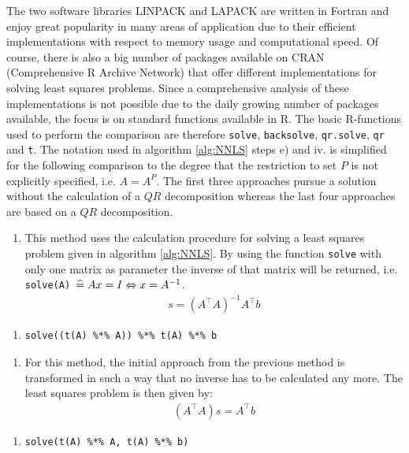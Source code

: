 The two software libraries LINPACK and LAPACK are written in Fortran and enjoy great popularity in many areas of application due to their efficient implementations with respect to memory usage and computational speed. Of course, there is also a big number of packages available on CRAN (Comprehensive R Archive Network) that offer different implementations for solving least squares problems. Since a comprehensive analysis of these implementations is not possible due to the daily growing number of packages available, the focus is on standard functions available in \textsf{R}. The basic \textsf{R}-functions used to perform the comparison are therefore \texttt{solve}, \texttt{backsolve}, \texttt{qr.solve}, \texttt{qr} and \texttt{t}. The notation used in algorithm \ref{alg:NNLS} steps e) and iv. is simplified for the following comparison to the degree that the restriction to set $P$ is not explicitly specified, i.e. $A = A^P$. The first three approaches pursue a solution without the calculation of a $QR$ decomposition whereas the last four approaches are based on a $QR$ decomposition. 


\begin{enumerate}[label={\bfseries Method \arabic*:}, leftmargin=*, labelindent=1em, series = quest]
	\item This method uses the calculation procedure for solving a least squares problem given in algorithm \ref{alg:NNLS}. By using the function \texttt{solve} with only one matrix as parameter the inverse of that matrix will be returned, i.e. \texttt{solve(A) $\mathrel{\widehat=} Ax = I \Leftrightarrow x = A^{-1}$}. 
	\begin{align*}
		s = (A^\top A)^{-1} A^\top b
	\end{align*}
\end{enumerate}

\begin{enumerate}[series = inform]
	\item[] \begin{lstlisting}[otherkeywords={\%*\%}, numbers=none]
			solve((t(A) %*% A)) %*% t(A) %*% b
			\end{lstlisting}
\end{enumerate}


\begin{enumerate}[resume*=quest]
	\item For this method, the initial approach from the previous method is transformed in such a way that no inverse has to be calculated any more. The least squares problem is then given by:  
	\begin{align*}
		(A^\top A)s =  A^\top b
	\end{align*}
\end{enumerate}
\begin{enumerate}[resume*=inform]
	\item[] \begin{lstlisting}[otherkeywords={\%*\%}, numbers=none]
			solve(t(A) %*% A, t(A) %*% b)
			\end{lstlisting}
\end{enumerate}


